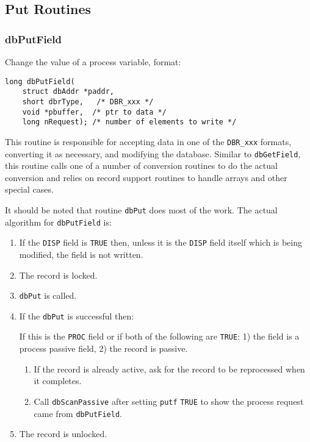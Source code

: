 \subsection{Put Routines}

\subsubsection{dbPutField}

Change the value of a process variable, format:

\begin{verbatim}
long dbPutField(
    struct dbAddr *paddr,
    short dbrType,   /* DBR_xxx */
    void *pbuffer,  /* ptr to data */
    long nRequest); /* number of elements to write */
\end{verbatim}

This routine is responsible for accepting data in one of the \verb|DBR_xxx| formats, converting it as necessary, and modifying the database.
Similar to \verb|dbGetField|, this routine calls one of a number of conversion routines to do the actual conversion and relies on record support routines to handle arrays and other special cases.

It should be noted that routine \verb|dbPut| does most of the work.
The actual algorithm for \verb|dbPutField| is:

\begin{enumerate}

\item If the \verb|DISP| field is \verb|TRUE| then, unless it is the \verb|DISP| field itself which is being modified, the field is not written.

\item The record is locked.

\item \verb|dbPut| is called.

\item If the \verb|dbPut| is successful then:

If this is the \verb|PROC| field or if both of the following are \verb|TRUE|:
1) the field is a process passive field,
2) the record is passive.

\begin{enumerate}

\item If the record is already active, ask for the record to be reprocessed when it completes.

\item Call \verb|dbScanPassive| after setting \verb|putf| \verb|TRUE| to show the process request came from \verb|dbPutField|.

\end{enumerate}

\item The record is unlocked.

\end{enumerate}


